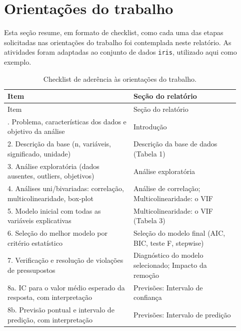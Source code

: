 \section{Orientações do trabalho}

Esta seção resume, em formato de checklist, como cada uma das etapas solicitadas nas orientações do trabalho foi contemplada neste relatório. As atividades foram adaptadas ao conjunto de dados \texttt{iris}, utilizado aqui como exemplo.

\begin{longtable}[]{@{}p{0.5\linewidth}p{0.42\linewidth}@{}}
\caption{Checklist de aderência às orientações do trabalho.}\tabularnewline
\toprule\noalign{}
Item & Seção do relatório \\
\midrule\noalign{}
\endfirsthead
\toprule\noalign{}
Item & Seção do relatório \\
\midrule\noalign{}
\endhead
\bottomrule\noalign{}
\endlastfoot
1. Problema, características dos dados e objetivo da análise & Introdução \\
2. Descrição da base (n, variáveis, significado, unidade) & Descrição da base de dados (Tabela 1) \\
3. Análise exploratória (dados ausentes, outliers, objetivos) & Análise exploratória \\
4. Análises uni/bivariadas: correlação, multicolinearidade, box-plot & Análise de correlação; Multicolinearidade: o VIF \\
5. Modelo inicial com todas as variáveis explicativas & Multicolinearidade: o VIF (Tabela 3) \\
6. Seleção do melhor modelo por critério estatístico & Seleção do modelo final (AIC, BIC, teste F, stepwise) \\
7. Verificação e resolução de violações de pressupostos & Diagnóstico do modelo selecionado; Impacto da remoção \\
8a. IC para o valor médio esperado da resposta, com interpretação & Previsões: Intervalo de confiança \\
8b. Previsão pontual e intervalo de predição, com interpretação & Previsões: Intervalo de predição \\
\end{longtable}
